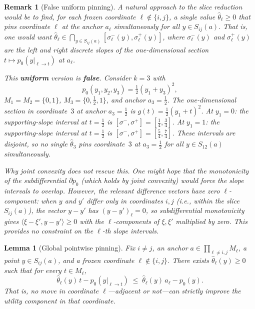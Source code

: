 \documentclass[11pt]{article}
\newtheorem{lemma}[theorem]{Lemma}
\newtheorem{remark}[theorem]{Remark}
\begin{document}
\begin{remark}[False uniform pinning]\label{rem:false}
A natural approach to the slice reduction would be to find, for each frozen
coordinate $\ell \notin \{i,j\}$, a \emph{single} value $\hat\theta_\ell \geq 0$
that pins coordinate $\ell$ at the anchor $a_\ell$ \emph{simultaneously for
all} $y \in S_{ij}(a)$.
That is, one would want
$\hat\theta_\ell \in \bigcap_{y \in S_{ij}(a)} [\sigma_\ell^-(y), \sigma_\ell^+(y)]$,
where $\sigma_\ell^-(y)$ and $\sigma_\ell^+(y)$ are the left and right
discrete slopes of the one-dimensional section $t \mapsto p_0(y|_{\ell \to t})$ at $a_\ell$.

This \textbf{uniform} version is \textbf{false}.
Consider $k = 3$ with
\[
  p_0(y_1, y_2, y_3) = \tfrac{1}{2}(y_1 + y_3)^2,
\]
$M_1 = M_2 = \{0,1\}$, $M_3 = \{0, \tfrac{1}{2}, 1\}$, and anchor $a_3 = \tfrac{1}{2}$.
The one-dimensional section in coordinate~$3$ at anchor $a_3 = \frac{1}{2}$ is
$g(t) = \frac{1}{2}(y_1 + t)^2$.
At $y_1 = 0$: the supporting-slope interval at $t = \frac{1}{2}$ is
$[\sigma^-, \sigma^+] = [\tfrac{1}{4}, \tfrac{3}{4}]$.
At $y_1 = 1$: the supporting-slope interval at $t = \frac{1}{2}$ is
$[\sigma^-, \sigma^+] = [\tfrac{5}{4}, \tfrac{7}{4}]$.
These intervals are \emph{disjoint}, so no single $\hat\theta_3$ pins
coordinate~$3$ at $a_3 = \frac{1}{2}$ for all $y \in S_{12}(a)$ simultaneously.

\smallskip\noindent
\emph{Why joint convexity does not rescue this.}
One might hope that the monotonicity of the subdifferential
$\partial p_0$ (which holds by joint convexity) would force the slope intervals to overlap.
However, the relevant difference vectors have zero $\ell$-component:
when $y$ and $y'$ differ only in coordinates $i,j$ (i.e., within the slice $S_{ij}(a)$),
the vector $y - y'$ has $(y-y')_\ell = 0$, so subdifferential monotonicity gives
$\langle \xi - \xi', y - y' \rangle \geq 0$
with the $\ell$-components of $\xi, \xi'$ multiplied by zero.
This provides no constraint on the $\ell$-th slope intervals.
\end{remark}

\begin{lemma}[Global pointwise pinning]\label{lem:pointwise}
Fix $i \neq j$, an anchor $a \in \prod_{\ell \neq i,j} M_\ell$,
a point $y \in S_{ij}(a)$, and a frozen coordinate $\ell \notin \{i,j\}$.
There exists $\hat\theta_\ell(y) \geq 0$ such that for every
$t \in M_\ell$,
\[
  \hat\theta_\ell(y)\, t - p_0(y|_{\ell \to t})
  \;\leq\;
  \hat\theta_\ell(y)\, a_\ell - p_0(y).
\]
That is, no move in coordinate $\ell$---adjacent or not---can strictly
improve the utility component in that coordinate.
\end{lemma}
\end{document}
